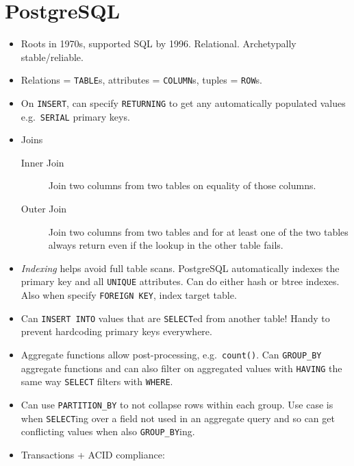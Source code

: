 \documentclass[10pt]{article}
\begin{document}
\section{PostgreSQL}

\begin{itemize}
    \item Roots in 1970s, supported SQL by 1996. Relational. Archetypally
        stable/reliable.
    \item Relations = \lstinline{TABLE}s, attributes = \lstinline{COLUMN}s,
        tuples = \lstinline{ROW}s.
    \item On \lstinline{INSERT}, can specify \lstinline{RETURNING} to get any
        automatically populated values e.g.\ \lstinline{SERIAL} primary keys.
    \item Joins
        \begin{description}
            \item[Inner Join] Join two columns from two tables on equality of
                those columns.
            \item[Outer Join] Join two columns from two tables and for at least
                one of the two tables always return even if the lookup in the
                other table fails.
        \end{description}
    \item \emph{Indexing} helps avoid full table scans. PostgreSQL automatically
        indexes the primary key and all \lstinline{UNIQUE} attributes. Can do
        either hash or btree indexes. Also when specify \lstinline{FOREIGN KEY},
        index target table.
    \item Can \lstinline{INSERT INTO} values that are \lstinline{SELECT}ed from
        another table! Handy to prevent hardcoding primary keys everywhere.
    \item Aggregate functions allow post-processing, e.g.\ \lstinline{count()}.
        Can \lstinline{GROUP_BY} aggregate functions and can also filter on
        aggregated values with \lstinline{HAVING} the same way
        \lstinline{SELECT} filters with \lstinline{WHERE}.
    \item Can use \lstinline{PARTITION_BY} to not collapse rows within each
        group. Use case is when \lstinline{SELECT}ing over a field not used in
        an aggregate query and so can get conflicting values when also
        \lstinline{GROUP_BY}ing.
    \item Transactions + ACID compliance:
        \begin{itemize}

\end{itemize}
\end{itemize}
\end{document}
